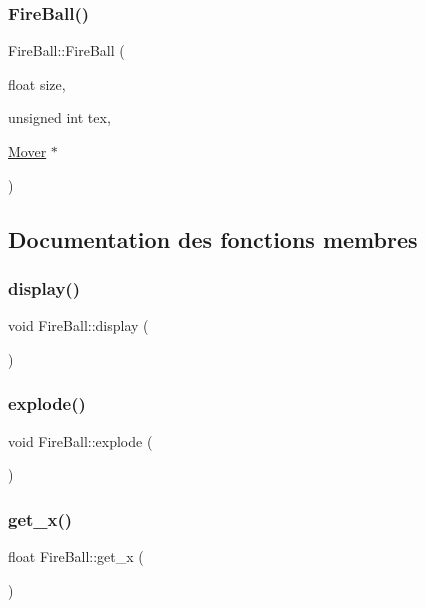 \subsubsection{\texorpdfstring{Fire\+Ball()}{FireBall()}}
{\footnotesize\ttfamily Fire\+Ball\+::\+Fire\+Ball (\begin{DoxyParamCaption}\item[{float}]{size,  }\item[{unsigned int}]{tex,  }\item[{\hyperlink{classMover}{Mover} $\ast$}]{ }\end{DoxyParamCaption})}



\subsection{Documentation des fonctions membres}
\mbox{\label{classFireBall_af9bcb6c7a1ed6a8df73091de2be6e222}} 
\subsubsection{\texorpdfstring{display()}{display()}}
{\footnotesize\ttfamily void Fire\+Ball\+::display (\begin{DoxyParamCaption}{ }\end{DoxyParamCaption})}

\mbox{\label{classFireBall_ab7e8e46f8cd978b77b16ee383581e1ff}} 
\subsubsection{\texorpdfstring{explode()}{explode()}}
{\footnotesize\ttfamily void Fire\+Ball\+::explode (\begin{DoxyParamCaption}{ }\end{DoxyParamCaption})\hspace{0.3cm}{\ttfamily [private]}}

\mbox{\label{classFireBall_a4c71d3cf7209ef9e03ea38ea90c0d508}} 
\subsubsection{\texorpdfstring{get\+\_\+x()}{get\_x()}}
{\footnotesize\ttfamily float Fire\+Ball\+::get\+\_\+x (\begin{DoxyParamCaption}{ }\end{DoxyParamCaption})\hspace{0.3cm}{\ttfamily [inline]}}


